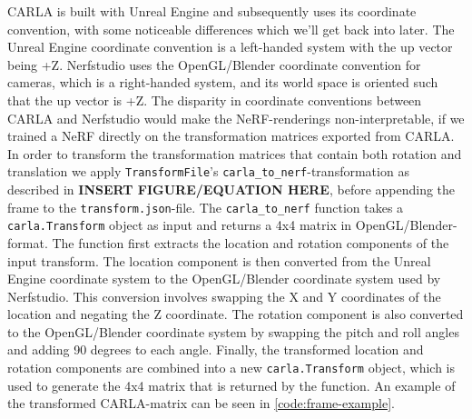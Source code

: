 CARLA is built with Unreal Engine and subsequently uses its coordinate convention, with some noticeable differences which we'll get back into later. The Unreal Engine coordinate convention is a left-handed system with the up vector being +Z. Nerfstudio uses the OpenGL/Blender coordinate convention for cameras, which is a right-handed system, and its world space is oriented such that the up vector is +Z. The disparity in coordinate conventions between CARLA and Nerfstudio would make the NeRF-renderings non-interpretable, if we trained a NeRF directly on the transformation matrices exported from CARLA. In order to transform the transformation matrices that contain both rotation and translation we apply \texttt{TransformFile}'s \texttt{carla\_to\_nerf}-transformation as described in \textbf{INSERT FIGURE/EQUATION HERE}, before appending the frame to the \texttt{transform.json}-file. The \texttt{carla\_to\_nerf} function takes a \texttt{carla.Transform} object as input and returns a 4x4 matrix in OpenGL/Blender-format. The function first extracts the location and rotation components of the input transform. The location component is then converted from the Unreal Engine coordinate system to the OpenGL/Blender coordinate system used by Nerfstudio. This conversion involves swapping the X and Y coordinates of the location and negating the Z coordinate. The rotation component is also converted to the OpenGL/Blender coordinate system by swapping the pitch and roll angles and adding 90 degrees to each angle. Finally, the transformed location and rotation components are combined into a new \texttt{carla.Transform} object, which is used to generate the 4x4 matrix that is returned by the function. An example of the transformed CARLA-matrix can be seen in \autoref{code:frame-example}.




